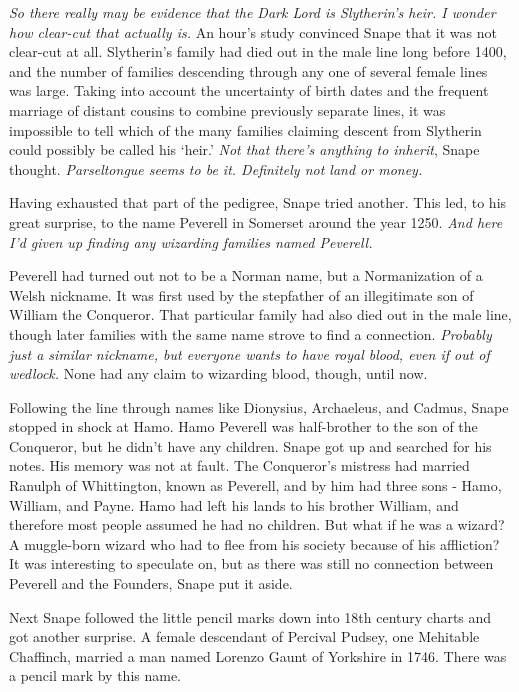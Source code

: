 \documentclass[a4paper,11pt]{article}
\begin{document}
\emph{So there really may be evidence that the Dark Lord is Slytherin's heir. I wonder how clear-cut that actually is.} An hour's study convinced Snape that it was not clear-cut at all. Slytherin's family had died out in the male line long before 1400, and the number of families descending through any one of several female lines was large. Taking into account the uncertainty of birth dates and the frequent marriage of distant cousins to combine previously separate lines, it was impossible to tell which of the many families claiming descent from Slytherin could possibly be called his `heir.' \emph{Not that there's anything to inherit}, Snape thought. \emph{Parseltongue seems to be it. Definitely not land or money.}

Having exhausted that part of the pedigree, Snape tried another. This led, to his great surprise, to the name Peverell in Somerset around the year 1250. \emph{And here I'd given up finding any wizarding families named Peverell.}

Peverell had turned out not to be a Norman name, but a Normanization of a Welsh nickname. It was first used by the stepfather of an illegitimate son of William the Conqueror. That particular family had also died out in the male line, though later families with the same name strove to find a connection. \emph{Probably just a similar nickname, but everyone wants to have royal blood, even if out of wedlock.} None had any claim to wizarding blood, though, until now.

Following the line through names like Dionysius, Archaeleus, and Cadmus, Snape stopped in shock at Hamo. Hamo Peverell was half-brother to the son of the Conqueror, but he didn't have any children. Snape got up and searched for his notes. His memory was not at fault. The Conqueror's mistress had married Ranulph of Whittington, known as Peverell, and by him had three sons - Hamo, William, and Payne. Hamo had left his lands to his brother William, and therefore most people assumed he had no children. But what if he was a wizard? A muggle-born wizard who had to flee from his society because of his affliction? It was interesting to speculate on, but as there was still no connection between Peverell and the Founders, Snape put it aside.

Next Snape followed the little pencil marks down into 18th century charts and got another surprise. A female descendant of Percival Pudsey, one Mehitable Chaffinch, married a man named Lorenzo Gaunt of Yorkshire in 1746. There was a pencil mark by this name.
\end{document}
